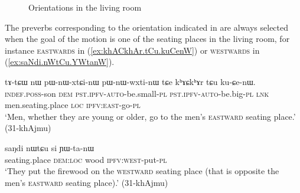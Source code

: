 \begin{figure} 
\caption{Orientations in the living room}
\label{fig:kitchen}
\end{figure}

The preverbs corresponding to the orientation indicated in  are always selected when the goal of the motion is one of the seating places in the living room, for instance \textsc{eastwards} in (\ref{ex:khACkhAr.tCu.kuCenW}) or \textsc{westwards} in (\ref{ex:saNdi.nWtCu.YWtanW}).

\begin{exe}
\ex \label{ex:khACkhAr.tCu.kuCenW}
\gll tɤ-tɕɯ nɯ pɯ-nɯ-xtɕi-nɯ pɯ-nɯ-wxti-nɯ tɕe kʰɤɕkʰɤr tɕu ku-ɕe-nɯ. \\
\textsc{indef}.\textsc{poss}-son \textsc{dem} \textsc{pst}.\textsc{ipfv}-\textsc{auto}-be.small-\textsc{pl} \textsc{pst}.\textsc{ipfv}-\textsc{auto}-be.big-\textsc{pl} \textsc{lnk} men.seating.place \textsc{loc} \textsc{ipfv}:\textsc{east}-go-\textsc{pl} \\
\glt `Men, whether they are young or older, go to the men's \textsc{eastward} seating place.' (31-khAjmu)
\end{exe}

\begin{exe}
\ex \label{ex:saNdi.nWtCu.YWtanW}
\gll  saŋdi nɯtɕu si ɲɯ-ta-nɯ \\
seating.place \textsc{dem}:\textsc{loc} wood \textsc{ipfv}:\textsc{west}-put-\textsc{pl} \\
\glt `They put the firewood on the \textsc{westward} seating place (that is opposite the men's \textsc{eastward} seating place).' (31-khAjmu) 
\end{exe}



